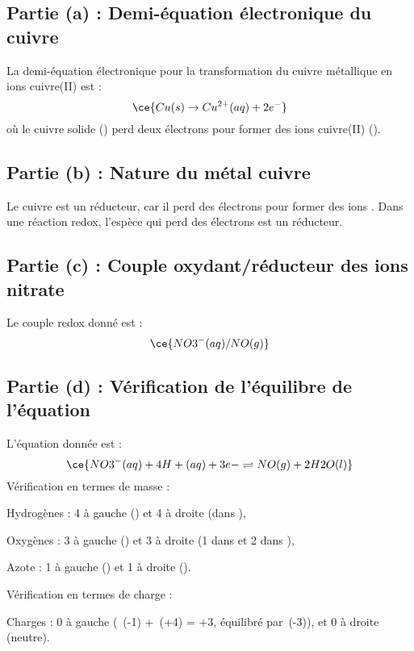 \documentclass[answers]{exam}
\begin{document}
\begin{solution}

\subsection*{Partie (a) : Demi-équation électronique du cuivre}

La demi-équation électronique pour la transformation du cuivre métallique en ions cuivre(II) est :
\[
\ce{Cu(s) \rightarrow Cu^{2+}(aq) + 2e^-}
\]
où le cuivre solide () perd deux électrons pour former des ions cuivre(II) ().

\subsection*{Partie (b) : Nature du métal cuivre}

Le cuivre est un réducteur, car il perd des électrons pour former des ions . Dans une réaction redox, l'espèce qui perd des électrons est un réducteur.

\subsection*{Partie (c) : Couple oxydant/réducteur des ions nitrate}

Le couple redox donné est :
\[
\ce{NO3^- (aq) / NO (g)}
\]

\subsection*{Partie (d) : Vérification de l'équilibre de l'équation}

L'équation donnée est :
\[
\ce{NO3^- (aq) + 4 H+ (aq) + 3 e- \rightleftharpoons NO (g) + 2 H2O (l)}
\]
Vérification en termes de masse :
\begin{compactitem}
    \item Hydrogènes : 4 à gauche () et 4 à droite (dans ),
    \item Oxygènes : 3 à gauche () et 3 à droite (1 dans  et 2 dans ),
    \item Azote : 1 à gauche () et 1 à droite ().
\end{compactitem}

Vérification en termes de charge :
\begin{compactitem}
    \item Charges : 0 à gauche ( \,(-1) +  \,(+4) = +3, équilibré par  \,(-3)), et 0 à droite (neutre).
\end{compactitem}


\end{solution}
\end{document}
